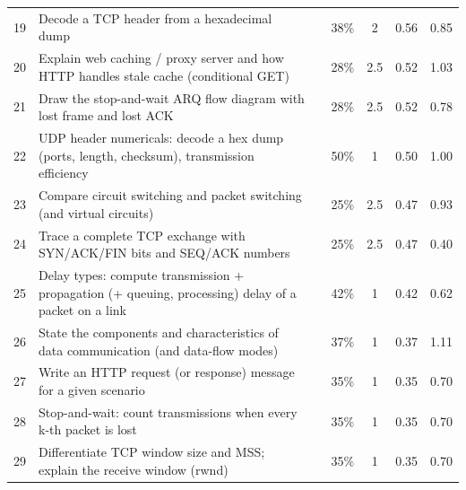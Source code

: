 {\begin{xltabular}{\linewidth}{r>{\raggedright\arraybackslash}Xccccc}
19 & Decode a TCP header from a hexadecimal dump &  & 38\% & 2 & 0.56 & 0.85\\
20 & Explain web caching / proxy server and how HTTP handles stale cache (conditional GET) &  & 28\% & 2.5 & 0.52 & 1.03\\
21 & Draw the stop-and-wait ARQ flow diagram with lost frame and lost ACK &  & 28\% & 2.5 & 0.52 & 0.78\\
22 & UDP header numericals: decode a hex dump (ports, length, checksum), transmission efficiency &  & 50\% & 1 & 0.50 & 1.00\\
23 & Compare circuit switching and packet switching (and virtual circuits) &  & 25\% & 2.5 & 0.47 & 0.93\\
24 & Trace a complete TCP exchange with SYN/ACK/FIN bits and SEQ/ACK numbers &  & 25\% & 2.5 & 0.47 & 0.40\\
25 & Delay types: compute transmission + propagation (+ queuing, processing) delay of a packet on a link &  & 42\% & 1 & 0.42 & 0.62\\
26 & State the components and characteristics of data communication (and data-flow modes) &  & 37\% & 1 & 0.37 & 1.11\\
27 & Write an HTTP request (or response) message for a given scenario &  & 35\% & 1 & 0.35 & 0.70\\
28 & Stop-and-wait: count transmissions when every k-th packet is lost &  & 35\% & 1 & 0.35 & 0.70\\
29 & Differentiate TCP window size and MSS; explain the receive window (rwnd) &  & 35\% & 1 & 0.35 & 0.70\\

\end{xltabular}}

